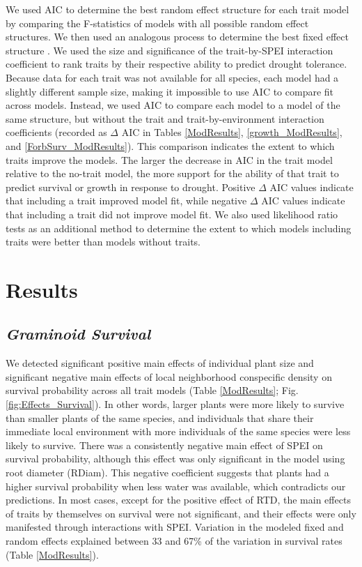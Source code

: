 \documentclass[12pt, letterpaper]{article}
\begin{document}
We used AIC to determine the best random effect structure for each trait model by comparing the F-statistics of models with all possible random effect structures. We then used an analogous process to determine the best fixed effect structure \cite{Bolker2009}. We used the size and significance of the trait-by-SPEI interaction coefficient to rank traits by their respective ability to predict drought tolerance. Because data for each trait was not available for all species, each model had a slightly different sample size, making it impossible to use AIC to compare fit across models. Instead, we used AIC to compare each model to a model of the same structure, but without the trait and trait-by-environment interaction coefficients (recorded as $\Delta$ AIC in Tables \ref{ModResults}, \ref{growth_ModResults}, and \ref{ForbSurv_ModResults}). This comparison indicates the extent to which traits improve the models. The larger the decrease in AIC in the trait model relative to the no-trait model, the more support for the ability of that trait to predict survival or growth in response to drought. Positive $\Delta$ AIC values indicate that including a trait improved model fit, while negative $\Delta$ AIC values indicate that including a trait did not improve model fit. We also used likelihood ratio tests as an additional method to determine the extent to which models including traits were better than models without traits.

\section{Results}
\subsection{\textit{Graminoid Survival}} 
We detected significant positive main effects of individual plant size and significant negative main effects of local neighborhood conspecific density on survival probability across all trait models (Table \ref{ModResults}; Fig. \ref{fig:Effects_Survival}). In other words, larger plants were more likely to survive than smaller plants of the same species, and individuals that share their immediate local environment with more individuals of the same species were less likely to survive. There was a consistently negative main effect of SPEI on survival probability, although this effect was only significant in the model using root diameter (RDiam). This negative coefficient suggests that plants had a higher survival probability when less water was available, which contradicts our predictions. In most cases, except for the positive effect of RTD, the main effects of traits by themselves on survival were not significant, and their effects were only manifested through interactions with SPEI. Variation in the modeled fixed and random effects explained between 33 and 67\% of the variation in survival rates (Table \ref{ModResults}).
\end{document}
